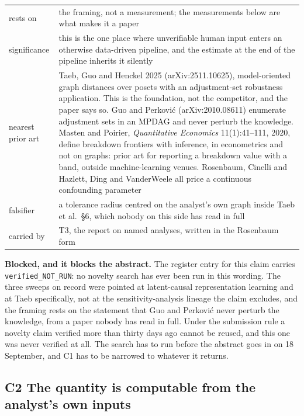 \begin{center}\footnotesize
\begin{tabular}{@{}p{2.6cm}p{13.75cm}@{}}
\toprule
rests on & the framing, not a measurement; the measurements below are what makes it a paper \\
significance & this is the one place where unverifiable human input enters an otherwise
data-driven pipeline, and the estimate at the end of the pipeline inherits it silently \\
nearest prior art & Taeb, Guo and Henckel 2025 (arXiv:2511.10625), model-oriented graph distances
over posets with an adjustment-set robustness application. This is the foundation, not the
competitor, and the paper says so. Guo and Perkovi\'c (arXiv:2010.08611) enumerate adjustment sets
in an MPDAG and never perturb the knowledge. Masten and Poirier, \emph{Quantitative Economics}
11(1):41--111, 2020, define breakdown frontiers with inference, in econometrics and not on graphs:
prior art for reporting a breakdown value with a band, outside machine-learning venues. Rosenbaum,
Cinelli and Hazlett, Ding and VanderWeele all price a continuous confounding parameter \\
falsifier & a tolerance radius centred on the analyst's own graph inside Taeb et al.\ \S6, which
nobody on this side has read in full \\
carried by & T3, the report on named analyses, written in the Rosenbaum form \\
\bottomrule
\end{tabular}
\end{center}

\begin{blocking}
\textbf{Blocked, and it blocks the abstract.} The register entry for this claim carries
\texttt{verified\_NOT\_RUN}: no novelty search has ever been run in this wording. The three sweeps
on record were pointed at latent-causal representation learning and at Taeb specifically, not at
the sensitivity-analysis lineage the claim excludes, and the framing rests on the statement that
Guo and Perkovi\'c never perturb the knowledge, from a paper nobody has read in full. Under the
submission rule a novelty claim verified more than thirty days ago cannot be reused, and this one
was never verified at all. The search has to run before the abstract goes in on 18 September, and
C1 has to be narrowed to whatever it returns.
\end{blocking}

\subsection*{C2 \quad The quantity is computable from the analyst's own inputs}


